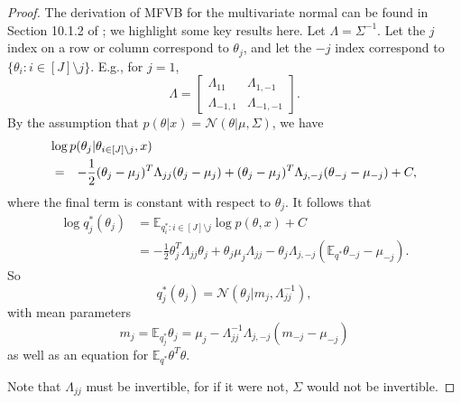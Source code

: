 \documentclass{article}\usepackage[]{graphicx}\usepackage[]{color}
\newcommand{\gauss}{\mathcal{N}} %
\newcommand{\constant}{C} %
\newcommand{\mbe}{\mathbb{E}}
\begin{document}
\begin{proof}
  The derivation of MFVB for the multivariate normal can be found in Section
  10.1.2 of \citep{bishop:2006:pattern}; we highlight some key results here. Let
  $\Lambda = \Sigma^{-1}$. Let the $j$ index on a row or column correspond to
  $\theta_j$, and let the $-j$ index correspond to $\{\theta_{i}: i \in
  [J]\setminus j\}$. E.g., for $j=1$,
  $$
    \Lambda
      = \left[ \begin{array}{ll}
          \Lambda_{11} & \Lambda_{1,-1} \\
          \Lambda_{-1,1} & \Lambda_{-1,-1}
        \end{array} \right].
  $$
  By the assumption that $p(\theta | x) = \gauss(\theta | \mu, \Sigma)$, we have
\begin{eqnarray}\label{eq:mvn_variational_dist}
  \lefteqn{\log p(\theta_{j} | \theta_{i \in [J]\setminus j}, x)} \nonumber\\
      &=& -\frac{1}{2} (\theta_{j} - \mu_{j})^{T} \Lambda_{jj} (\theta_j - \mu_j) +
         (\theta_{j} - \mu_{j})^{T} \Lambda_{j,-j} (\theta_{-j} - \mu_{-j}) + \constant,
\end{eqnarray}
%
  where the final term is constant with respect to $\theta_{j}$.
  It follows that
  \begin{align*}
    \log q^{*}_{j}(\theta_j)
      &= \mbe_{q^{*}_{i}: i \in [J]\setminus j} \log p(\theta, x) + \constant \\
      &= -\frac{1}{2} \theta_{j}^{T} \Lambda_{jj} \theta_j + \theta_j \mu_j \Lambda_{jj} - \theta_j \Lambda_{j,-j} (\mbe_{q^{*}} \theta_{-j} - \mu_{-j}).
  \end{align*}
  So
  \begin{equation*}
    q^*_j(\theta_j) = \gauss(\theta_j | m_{j}, \Lambda_{jj}^{-1}),
  \end{equation*}
  with mean parameters
  \begin{equation} \label{eq:mvn_stable_point}
    m_{j} = \mbe_{q^{*}_j} \theta_j = \mu_{j} - \Lambda_{jj}^{-1} \Lambda_{j,-j} (m_{-j} - \mu_{-j})
  \end{equation}
  as well as an equation for $\mbe_{q^{*}} \theta^T \theta$.

Note that $\Lambda_{jj}$ must be invertible, for if it were not, $\Sigma$ would
not be invertible.


\end{proof}
\end{document}
